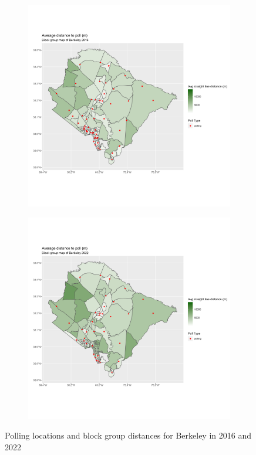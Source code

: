 \documentclass[11pt]{article}
\theoremstyle{remark}
\theoremstyle{definition}
\begin{document}
\begin{figure}
	\begin{subfigure}{.5\textwidth}
		\centering
		\includegraphics[width=\linewidth]{result analysis/Berkeley_SC_original_configs/distance_map_Berkeley_config_original_2016_polls.png}
		\label{sfig:York_2016_bg_dist}
	\end{subfigure} 
	\begin{subfigure}{.5\textwidth}
		\centering
		\includegraphics[width=\linewidth]{result analysis/Berkeley_SC_original_configs/distance_map_Berkeley_config_original_2022_polls.png}
		\label{sfig:Berkeley_2022_bg_dist}
	\end{subfigure}
	\caption{Polling locations and block group distances for Berkeley in 2016 and 2022}
	\label{fig:Berkeley distance maps}
\end{figure}
\end{document}
